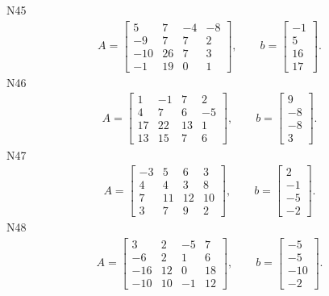 \documentclass[11pt]{report}
\begin{document}
N45
\begin{align*}
 A = \left[\begin{matrix}5 & 7 & -4 & -8\\-9 & 7 & 7 & 2\\-10 & 26 & 7 & 3\\-1 & 19 & 0 & 1\end{matrix}\right],
\qquad b = \left[\begin{matrix}-1\\5\\16\\17\end{matrix}\right]. 
 \end{align*}
N46
\begin{align*}
 A = \left[\begin{matrix}1 & -1 & 7 & 2\\4 & 7 & 6 & -5\\17 & 22 & 13 & 1\\13 & 15 & 7 & 6\end{matrix}\right],
\qquad b = \left[\begin{matrix}9\\-8\\-8\\3\end{matrix}\right]. 
 \end{align*}
N47
\begin{align*}
 A = \left[\begin{matrix}-3 & 5 & 6 & 3\\4 & 4 & 3 & 8\\7 & 11 & 12 & 10\\3 & 7 & 9 & 2\end{matrix}\right],
\qquad b = \left[\begin{matrix}2\\-1\\-5\\-2\end{matrix}\right]. 
 \end{align*}
N48
\begin{align*}
 A = \left[\begin{matrix}3 & 2 & -5 & 7\\-6 & 2 & 1 & 6\\-16 & 12 & 0 & 18\\-10 & 10 & -1 & 12\end{matrix}\right],
\qquad b = \left[\begin{matrix}-5\\-5\\-10\\-2\end{matrix}\right]. 
 \end{align*}
\end{document}
